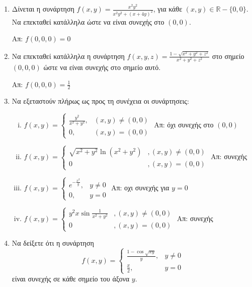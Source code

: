 \begin{enumerate}
  \item Δίνεται η συνάρτηση $f(x,y)=\frac{x^{2}y^{2}}{x^{2}y^{2}+(x+4y)^{2}}$, για κάθε $(x,y)\in \mathbb{R}-\{0,0\}$. Να επεκταθεί κατάλληλα ώστε να είναι συνεχής στο $(0,0)$.

	  \hfill Απ: $ f(0,0,0) = 0 $

  \item Να επεκταθεί κατάλληλα η συνάρτηση $ f(x,y,z) = \frac{ 1 - \sqrt{ x^{2}+y^{2}+z^{2} } }{
	  x^{2}+y^{2}+z^{2}} $ στο σημείο $ (0,0,0) $ ώστε να είναι συνεχής στο σημείο αυτό.

		  \hfill Απ: $ f(0,0,0)= \frac{ 1 }{ 2 } $

  \item Να εξεταστούν πλήρως ως προς τη συνέχεια οι συνάρτησεις:
	  \begin{enumerate}[i)]
          \item $ f(x,y) = \begin{cases} \frac{y^{2}}{x^{2}+y^{2}}, & (x,y) \neq (0,0) \\ 0, & (x,y)
              = (0,0)\end{cases} $
              \hfill Απ: όχι συνεχής στο $ (0,0) $ 
		  \item   \(
			  f(x,y) = \begin{cases}
				  \sqrt{x^{2}+y^{2}}\ln(x^{2}+y^{2}) &, (x,y)\neq (0,0) \\
				  0 &, (x,y)=(0,0)
			  \end{cases}
      \) \hfill Απ: συνεχής
      \item   \(
        f(x,y)=\begin{cases}
          e^{-\frac{x^{2}}{y}}, & y \neq 0 \\
          0, & y=0 
      \end{cases}
        \) \hfill Απ: οχι συνεχής για $y=0$
        \item   \(
          f(x,y)=\begin{cases}
            y^{2}x\sin \frac{1}{x^{2}+y^{2}} &, (x,y)\neq (0,0)\\
            0 &, (x,y)=(0,0)
        \end{cases}
          \) \hfill Απ: συνεχής
  \end{enumerate}
  \item Να δείξετε ότι η συνάρτηση 
      \[
          f(x,y) = \begin{cases} \frac{1- \cos{\sqrt{xy}}}{y}, & y \neq 0 \\ \frac{x}{2}, & y = 0  \end{cases}  
       \] 
       είναι συνεχής σε κάθε σημείο του άξονα $ y $.
\end{enumerate}


